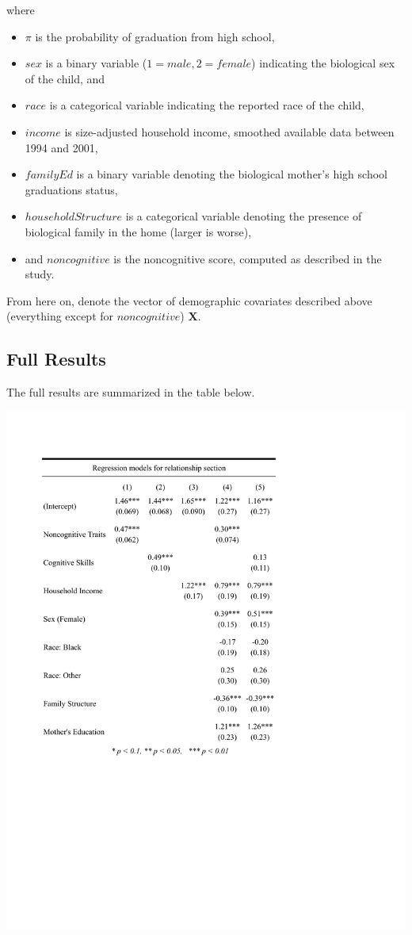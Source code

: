 \documentclass[11pt]{article}
\begin{document}
\noindent where

\begin{itemize} \itemsep1pt \parskip0pt 
	\item $\pi$ is the probability of graduation from high school,
	\item $sex$ is a binary variable ($1=male, 2=female$) indicating the biological sex of the child, and
	\item $race$ is a categorical variable indicating the reported race of the child,
	\item $income$ is size-adjusted household income, smoothed available data between 1994 and 2001,
	\item $familyEd$ is a binary variable denoting the biological mother's high school graduations status,
	\item $householdStructure$ is a categorical variable denoting the presence of biological family in the home (larger is worse),
	\item and $noncognitive$ is the noncognitive score, computed as described in the study.
\end{itemize}

From here on, denote the vector of demographic covariates described above (everything except for $noncognitive$) $\mathbf{X}$.

\subsection{Full Results}
The full results are summarized in the table below.

{\centering
\includegraphics[scale=0.8]{relationship.pdf}\\}
\end{document}

